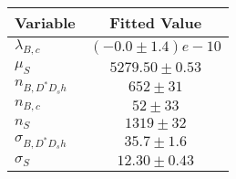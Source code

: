 \begin{tabular}[t]{lc}
\hline
Variable &Fitted Value\\
\hline\hline
$\lambda_{B,c}$&$(-0.0\pm1.4)e-10$\\
\hline
$\mu_S$&$5279.50\pm0.53$\\
\hline
$n_{B, D^* D_s h}$&$652\pm31$\\
\hline
$n_{B,c}$&$52\pm33$\\
\hline
$n_S$&$1319\pm32$\\
\hline
$\sigma_{B, D^* D_s h}$&$35.7\pm1.6$\\
\hline
$\sigma_S$&$12.30\pm0.43$\\
\hline
\end{tabular}
